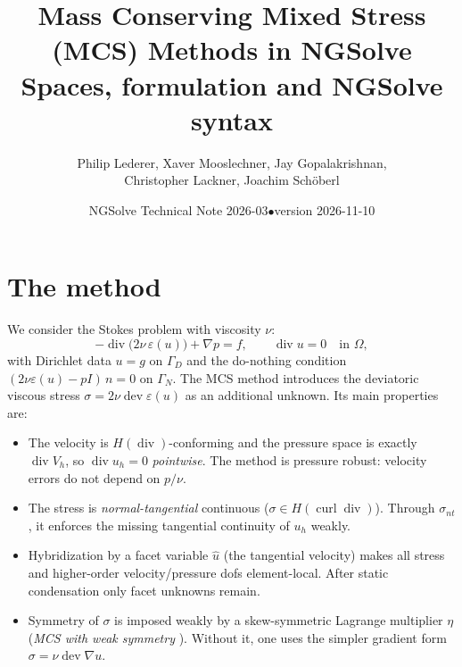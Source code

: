 \documentclass[10pt,a4paper]{article}
\title{\vspace{-1.2cm}Mass Conserving Mixed Stress (MCS) Methods in NGSolve\\[2pt]
\large Spaces, formulation and NGSolve syntax}
\author{Philip Lederer, Xaver Mooslechner, Jay Gopalakrishnan,\\ Christopher Lackner, Joachim Sch\"oberl}
\date{NGSolve Technical Note 2026-03\quad$\bullet$\quad version 2026-11-10}
\newcommand{\dev}{\operatorname{dev}}
\begin{document}
\maketitle\vspace{-0.9cm}

\section{The method}

We consider the Stokes problem with viscosity $\nu$:
\[
  -\operatorname{div}\bigl(2\nu\,\varepsilon(u)\bigr) + \nabla p = f, \qquad \operatorname{div} u = 0 \quad\text{in } \Omega,
\]
with Dirichlet data $u = g$ on $\Gamma_D$ and the do-nothing condition $(2\nu\varepsilon(u) - pI)\,n = 0$ on $\Gamma_N$.
The MCS method \cite{gls1,lederer} introduces the deviatoric viscous stress $\sigma = 2\nu \dev\varepsilon(u)$ as an additional unknown. Its main properties are:
\begin{itemize}\setlength\itemsep{1pt}
\item The velocity is $H(\operatorname{div})$-conforming and the pressure space is exactly $\operatorname{div} V_h$, so $\operatorname{div} u_h = 0$ \emph{pointwise}. The method is pressure robust: velocity errors do not depend on $p/\nu$.
\item The stress is \emph{normal-tangential} continuous ($\sigma \in H(\operatorname{curl}\operatorname{div})$). Through $\sigma_{nt}$, it enforces the missing tangential continuity of $u_h$ weakly.
\item Hybridization by a facet variable $\hat u$ (the tangential velocity) makes all stress and higher-order velocity/pressure dofs element-local. After static condensation only facet unknowns remain.
\item Symmetry of $\sigma$ is imposed weakly by a skew-symmetric Lagrange multiplier $\eta$ (\emph{MCS with weak symmetry} \cite{gls2}). Without it, one uses the simpler gradient form $\sigma = \nu\dev\nabla u$.
\end{itemize}
\end{document}
